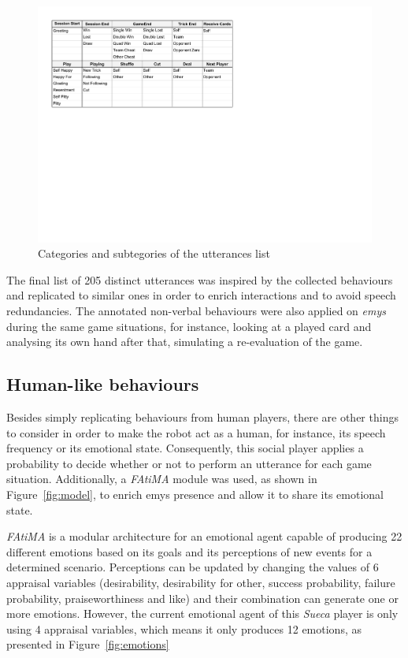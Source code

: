 \begin{figure}[ht]
	\centering
    \includegraphics[width=1\textwidth]{./img/utterances}
	\caption{Categories and subtegories of the utterances list}
\label{fig:utterances}
\end{figure}

The final list of 205 distinct utterances was inspired by the collected behaviours and replicated to similar ones in order to enrich interactions and to avoid speech redundancies.
The annotated non-verbal behaviours were also applied on \emph{emys} during the same game situations, for instance, looking at a played card and analysing its own hand after that, simulating a re-evaluation of the game.

\subsection{Human-like behaviours}

Besides simply replicating behaviours from human players, there are other things to consider in order to make the robot act as a human, for instance, its speech frequency or its emotional state.
Consequently, this social player applies a probability to decide whether or not to perform an utterance for each game situation.
Additionally, a \emph{FAtiMA} module was used, as shown in Figure~\ref{fig:model}, to enrich \ac{emys} presence and allow it to share its emotional state.

\emph{FAtiMA} is a modular architecture for an emotional agent capable of producing 22 different emotions based on its goals and its perceptions of new events for a determined scenario.
Perceptions can be updated by changing the values of 6 appraisal variables (desirability, desirability for other, success probability, failure probability, praiseworthiness and like) and their combination can generate one or more emotions.
However, the current emotional agent of this \emph{Sueca} player is only using 4 appraisal variables, which means it only produces 12 emotions, as presented in Figure~\ref{fig:emotions}

